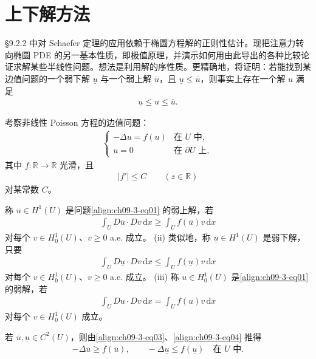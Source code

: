 \documentclass[../../main.tex]{subfiles}
\begin{document}
\section{上下解方法}\label{section:ch09-3-上下解方法}

\S9.2.2 中对 Schaefer 定理的应用依赖于椭圆方程解的正则性估计。现把注意力转向椭圆 PDE 的另一基本性质，即极值原理，并演示如何用由此导出的各种比较论证求解某些半线性问题。想法是利用解的序性质。更精确地，将证明：若能找到某边值问题的一个弱下解 $\underline{u}$ 与一个弱上解 $\overline{u}$，且 $\underline{u}\leqslant\overline{u}$，则事实上存在一个解 $u$ 满足
\begin{align*}
\underline{u}\leqslant u\leqslant\overline{u}.
\end{align*}

考察非线性 Poisson 方程的边值问题：
\begin{align}
\begin{cases}
-\Delta u=f(u)&\text{在 }U\text{ 中},\\
u=0&\text{在 }\partial U\text{ 上},
\end{cases}\label{align:ch09-3-eq01}
\end{align}
其中 $f:\mathbb{R}\to\mathbb{R}$ 光滑，且
\begin{align}
|f'|\leqslant C\qquad (z\in\mathbb{R})\label{align:ch09-3-eq02}
\end{align}
对某常数 $C$。

\begin{definition}[i]\label{definition:ch09-3-上下解} 称 $\overline{u}\in H^1(U)$ 是问题\eqref{align:ch09-3-eq01} 的弱上解，若
\begin{align}
\int_U D\overline{u}\cdot Dv\,\mathrm{d}x\geqslant\int_U f(\overline{u})v\,\mathrm{d}x\label{align:ch09-3-eq03}
\end{align}
对每个 $v\in H_0^1(U)$、$v\geqslant 0$ a.e. 成立。
(ii) 类似地，称 $\underline{u}\in H^1(U)$ 是弱下解，只要
\begin{align}
\int_U D\underline{u}\cdot Dv\,\mathrm{d}x\leqslant\int_U f(\underline{u})v\,\mathrm{d}x\label{align:ch09-3-eq04}
\end{align}
对每个 $v\in H_0^1(U)$、$v\geqslant 0$ a.e. 成立。
(iii) 称 $u\in H_0^1(U)$ 是\eqref{align:ch09-3-eq01} 的弱解，若
\begin{align*}
\int_U Du\cdot Dv\,\mathrm{d}x=\int_U f(u)v\,\mathrm{d}x
\end{align*}
对每个 $v\in H_0^1(U)$ 成立。
\end{definition}

\begin{remark}
若 $\overline{u},\underline{u}\in C^2(U)$，则由\eqref{align:ch09-3-eq03}、\eqref{align:ch09-3-eq04} 推得
\begin{align*}
-\Delta\overline{u}\geqslant f(\overline{u}),\qquad -\Delta\underline{u}\leqslant f(\underline{u})\quad\text{在 }U\text{ 中}.
\end{align*}
\end{remark}
\end{document}
